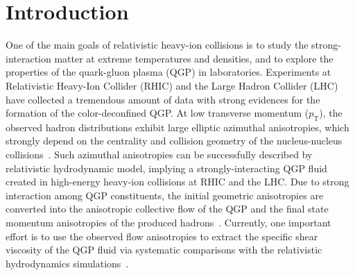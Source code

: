 \documentclass[aps,superscriptaddress,prc,twocolumn,nofootinbib]{revtex4}
\begin{document}
\maketitle


\section{Introduction}
\label{sec:Introduction}

One of the main goals of relativistic heavy-ion collisions is to study the strong-interaction matter at extreme temperatures and densities, and to explore the properties of the quark-gluon plasma (QGP) in laboratories.
Experiments at Relativistic Heavy-Ion Collider (RHIC) and the Large Hadron Collider (LHC) have collected a tremendous amount of data with strong evidences for the formation of the color-deconfined QGP.
At low transverse momentum ($p_\mathrm{T}$), the observed hadron distributions exhibit large elliptic azimuthal anisotropies, which strongly depend on the centrality and collision geometry of the nucleus-nucleus collisions~\cite{Ollitrault:1992bk, Adler:2003kt, Adams:2003am, Aamodt:2010pa}.
Such azimuthal anisotropies can be successfully described by relativistic hydrodynamic model, implying a strongly-interacting QGP fluid  created in high-energy heavy-ion collisions at RHIC and the LHC.
Due to strong interaction among QGP constituents, the initial geometric anisotropies are converted into the anisotropic collective flow of the QGP and the final state momentum anisotropies of the produced hadrons~\cite{Gyulassy:1996br, Aguiar:2001ac, Broniowski:2007ft, Andrade:2008xh, Hirano:2009ah, Alver:2010gr, Petersen:2010cw, Qin:2010pf, Staig:2010pn, Teaney:2010vd, Schenke:2010rr, Ma:2010dv, Qiu:2011iv, Zhao:2019ehg}.
Currently, one important effort is to use the observed flow anisotropies to extract the specific shear viscosity of the QGP fluid via systematic comparisons with the relativistic hydrodynamics simulations~\cite{Heinz:2013th, Gale:2013da, Huovinen:2013wma, Bernhard:2019bmu, JETSCAPE:2020shq}.
\end{document}
